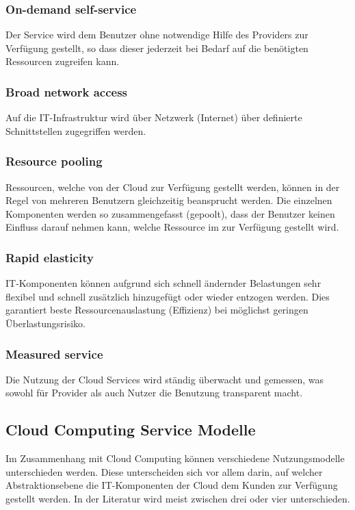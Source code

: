 \documentclass{report}
\begin{document}
\subsubsection{On-demand self-service}
Der Service wird dem Benutzer ohne notwendige Hilfe des Providers zur Verfügung gestellt, so dass dieser jederzeit bei Bedarf auf die benötigten Ressourcen zugreifen kann.

\subsubsection{Broad network access}
Auf die IT-Infrastruktur wird über Netzwerk (Internet) über definierte Schnittstellen zugegriffen werden.

\subsubsection{Resource pooling}
Ressourcen, welche von der Cloud zur Verfügung gestellt werden, können in der Regel von mehreren Benutzern gleichzeitig beansprucht werden. Die einzelnen Komponenten werden so zusammengefasst (gepoolt), dass der Benutzer keinen Einfluss darauf nehmen kann, welche Ressource im zur Verfügung gestellt wird.

\subsubsection{Rapid elasticity}
IT-Komponenten können aufgrund sich schnell ändernder Belastungen sehr flexibel und schnell zusätzlich hinzugefügt oder wieder entzogen werden. Dies garantiert beste Ressourcenauslastung (Effizienz) bei möglichst geringen Überlastungsrisiko.

\subsubsection{Measured service}
Die Nutzung der Cloud Services wird ständig überwacht und gemessen, was sowohl für Provider als auch Nutzer die Benutzung transparent macht.

\subsection{Cloud Computing Service Modelle}
Im Zusammenhang mit Cloud Computing können verschiedene Nutzungsmodelle unterschieden werden. Diese unterscheiden sich vor allem darin, auf welcher Abstraktionsebene die IT-Komponenten der Cloud dem Kunden zur Verfügung gestellt werden. In der Literatur wird meist zwischen drei oder vier unterschieden.
\end{document}
